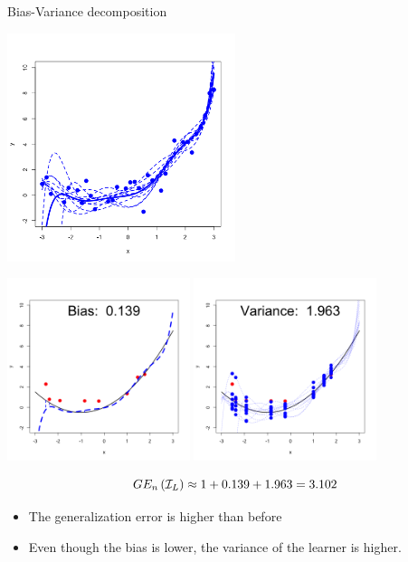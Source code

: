 \documentclass[11pt,compress,t,notes=noshow, xcolor=table]{beamer}
\begin{document}
\begin{vbframe} {Bias-Variance decomposition}
\begin{center}
  \includegraphics[width = 0.5\textwidth]{figure/bias_variance_decomposition-complex_model.png}
\end{center}


\framebreak

\begin{center}
  \includegraphics[width = 0.4\textwidth]{figure/bias_variance_decomposition-complex_model_bias.png}
  \includegraphics[width = 0.4\textwidth]{figure/bias_variance_decomposition-complex_model_variance.png}
\end{center}

$$GE_n\left(\mathcal{I}_{L}\right) \approx 1 + 0.139 + 1.963 = 3.102 $$

\begin{itemize}
  \item The generalization error is higher than before
  \item Even though the bias is lower, the variance of the learner is higher. 
\end{itemize}




\end{vbframe}
\end{document}
